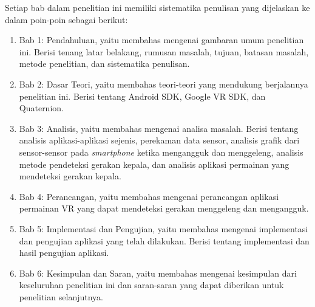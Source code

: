 Setiap bab dalam penelitian ini memiliki sistematika penulisan yang dijelaskan ke dalam poin-poin sebagai berikut:
\begin{enumerate}
	\item Bab 1: Pendahuluan, yaitu membahas mengenai gambaran umum penelitian ini. Berisi tenang latar belakang, rumusan masalah, tujuan, batasan masalah, metode penelitian, dan sistematika penulisan.
	\item Bab 2: Dasar Teori, yaitu membahas teori-teori yang mendukung berjalannya penelitian ini. Berisi tentang Android SDK, Google VR SDK, dan Quaternion.
	\item Bab 3: Analisis, yaitu membahas mengenai analisa masalah. Berisi tentang analisis aplikasi-aplikasi sejenis, perekaman data sensor, analisis grafik dari sensor-sensor pada \textit{smartphone} ketika mengangguk dan menggeleng, analisis metode pendeteksi gerakan kepala, dan analisis aplikasi permainan yang mendeteksi gerakan kepala. 
	\item Bab 4: Perancangan, yaitu membahas mengenai perancangan aplikasi permainan VR yang dapat mendeteksi gerakan menggeleng dan mengangguk.
	\item Bab 5: Implementasi dan Pengujian, yaitu membahas mengenai implementasi dan pengujian aplikasi yang telah dilakukan. Berisi tentang implementasi dan hasil pengujian aplikasi.
	\item Bab 6: Kesimpulan dan Saran, yaitu membahas mengenai kesimpulan dari keseluruhan penelitian ini dan saran-saran yang dapat diberikan untuk penelitian selanjutnya. 
\end{enumerate}